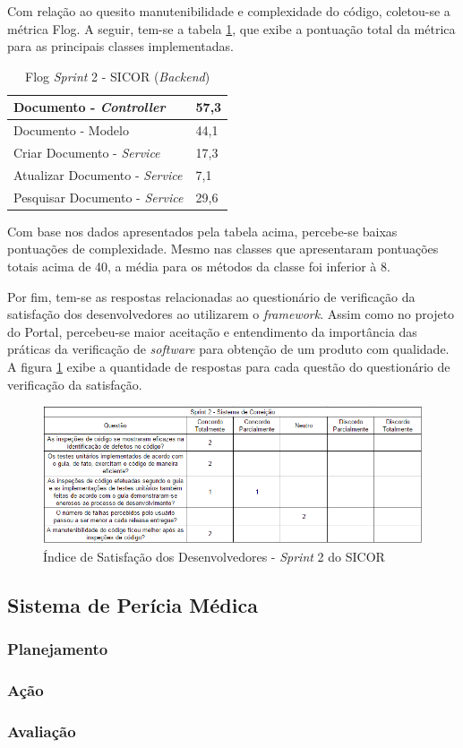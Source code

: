 Com relação ao quesito manutenibilidade e complexidade do código, coletou-se a métrica Flog. A seguir, tem-se a tabela \ref{table:tabela16}, que exibe a pontuação total da métrica para as principais classes implementadas.

\begin{table}[h]
\caption{Flog \textit{Sprint} 2 - SICOR (\textit{Backend})}
\centering
\begin{tabular}{ | m{12cm} | m{4cm} | } 
\hline
Documento - \textit{Controller} & 57,3 \\ 
\hline
Documento - Modelo & 44,1 \\ 
\hline
Criar Documento - \textit{Service} & 17,3 \\ 
\hline
Atualizar Documento - \textit{Service} & 7,1 \\ 
\hline
Pesquisar Documento - \textit{Service} & 29,6 \\
\hline
\end{tabular}
\label{table:tabela16}
\end{table}

Com base nos dados apresentados pela tabela acima, percebe-se baixas pontuações de complexidade. Mesmo nas classes que apresentaram pontuações totais acima de 40, a média para os métodos da classe foi inferior à 8.

Por fim, tem-se as respostas relacionadas ao questionário de verificação da satisfação dos desenvolvedores ao utilizarem o \textit{framework}. Assim como no projeto do Portal, percebeu-se maior aceitação e entendimento da importância das práticas da verificação de \textit{software} para obtenção de um produto com qualidade. A figura \ref{fig:satisfacaoSicor2} exibe a quantidade de respostas para cada questão do questionário de verificação da satisfação.

\begin{figure}[h]
\includegraphics[width=\textwidth]{figuras/isd_sicor_2.png}
\caption{Índice de Satisfação dos Desenvolvedores - \textit{Sprint} 2 do SICOR}
\label{fig:satisfacaoSicor2}
\end{figure}

\clearpage

\subsection{Sistema de Perícia Médica}

\subsubsection{Planejamento}

\subsubsection{Ação}

\subsubsection{Avaliação}

\clearpage